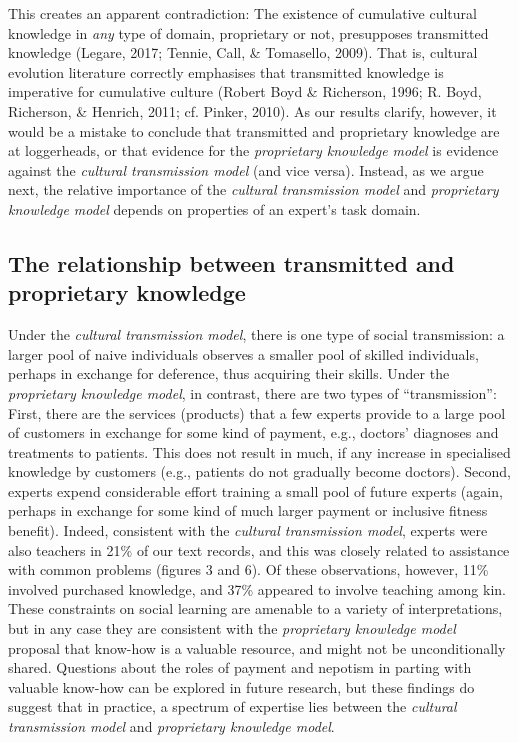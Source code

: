 \documentclass[
  11pt,
]{article}
\begin{document}
This creates an apparent contradiction: The existence of cumulative cultural knowledge in \emph{any} type of domain, proprietary or not, presupposes transmitted knowledge (Legare, 2017; Tennie, Call, \& Tomasello, 2009). That is, cultural evolution literature correctly emphasises that transmitted knowledge is imperative for cumulative culture (Robert Boyd \& Richerson, 1996; R. Boyd, Richerson, \& Henrich, 2011; cf. Pinker, 2010). As our results clarify, however, it would be a mistake to conclude that transmitted and proprietary knowledge are at loggerheads, or that evidence for the \emph{proprietary knowledge model} is evidence against the \emph{cultural transmission model} (and vice versa). Instead, as we argue next, the relative importance of the \emph{cultural transmission model} and \emph{proprietary knowledge model} depends on properties of an expert's task domain.

\hypertarget{the-relationship-between-transmitted-and-proprietary-knowledge}{%
\subsection{The relationship between transmitted and proprietary knowledge}\label{the-relationship-between-transmitted-and-proprietary-knowledge}}

Under the \emph{cultural transmission model}, there is one type of social transmission: a larger pool of naive individuals observes a smaller pool of skilled individuals, perhaps in exchange for deference, thus acquiring their skills. Under the \emph{proprietary knowledge model}, in contrast, there are two types of ``transmission'': First, there are the services (products) that a few experts provide to a large pool of customers in exchange for some kind of payment, e.g., doctors' diagnoses and treatments to patients. This does not result in much, if any increase in specialised knowledge by customers (e.g., patients do not gradually become doctors). Second, experts expend considerable effort training a small pool of future experts (again, perhaps in exchange for some kind of much larger payment or inclusive fitness benefit). Indeed, consistent with the \emph{cultural transmission model}, experts were also teachers in 21\% of our text records, and this was closely related to assistance with common problems (figures 3 and 6). Of these observations, however, 11\% involved purchased knowledge, and 37\% appeared to involve teaching among kin. These constraints on social learning are amenable to a variety of interpretations, but in any case they are consistent with the \emph{proprietary knowledge model} proposal that know-how is a valuable resource, and might not be unconditionally shared. Questions about the roles of payment and nepotism in parting with valuable know-how can be explored in future research, but these findings do suggest that in practice, a spectrum of expertise lies between the \emph{cultural transmission model} and \emph{proprietary knowledge model}.
\end{document}

